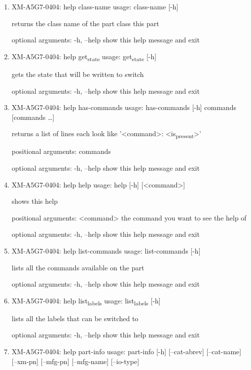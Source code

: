 \documentclass[11pt]{article}
\begin{document}
\begin{enumerate}
\item XM-A5G7-0404: help class-name
\label{sec:orgbd4598d}
usage: class-name [-h]

returns the class name of the part class this part

optional arguments:
  -h, --help  show this help message and exit

\item XM-A5G7-0404: help get\textsubscript{state}
\label{sec:org6dd5430}
usage: get\textsubscript{state} [-h]

gets the state that will be written to switch

optional arguments:
  -h, --help  show this help message and exit

\item XM-A5G7-0404: help has-commands
\label{sec:orga4e2928}
usage: has-commands [-h] commands [commands \ldots{}]

returns a list of lines each look like '<command>: <is\textsubscript{present}>'

positional arguments:
  commands

optional arguments:
  -h, --help  show this help message and exit

\item XM-A5G7-0404: help help
\label{sec:org37a90f7}
usage: help [-h] [<command>]

shows this help

positional arguments:
  <command>   the command you want to see the help of

optional arguments:
  -h, --help  show this help message and exit

\item XM-A5G7-0404: help list-commands
\label{sec:org97965f9}
usage: list-commands [-h]

lists all the commands available on the part

optional arguments:
  -h, --help  show this help message and exit

\item XM-A5G7-0404: help list\textsubscript{labels}
\label{sec:orgca65e3d}
usage: list\textsubscript{labels} [-h]

lists all the labels that can be switched to

optional arguments:
  -h, --help  show this help message and exit

\item XM-A5G7-0404: help part-info
\label{sec:org492d5f7}
usage: part-info  [-h] [--cat-abrev] [--cat-name] [--xm-pn] [--mfg-pn] [--mfg-name]
        [--io-type]


\end{enumerate}
\end{document}
